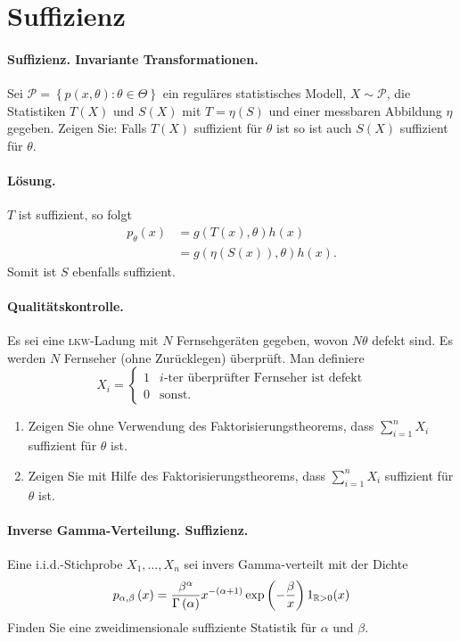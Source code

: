 \section{Suffizienz}


\paragraph{Suffizienz. Invariante Transformationen.} 
Sei $\mathcal P = \left\{ p(x,\theta) : \theta\in\Theta \right\}$ ein reguläres
statistisches Modell, $X\sim \mathcal P$, die Statistiken $T(X)$ und $S(X)$ mit
$T=\eta(S)$ und einer messbaren Abbildung $\eta$ gegeben. Zeigen Sie: Falls
$T(X)$ suffizient für $\theta$ ist so ist auch $S(X)$ suffizient für $\theta$.

\paragraph*{Lösung.} $T$ ist suffizient, so folgt
\begin{align*}
    p_\theta(x) &= g(T(x), \theta) h(x) \\
    &= g(\eta(S(x)), \theta) h(x). 
\end{align*}
Somit ist $S$ ebenfalls suffizient. 



\paragraph{Qualitätskontrolle.} 
Es sei eine \textsc{lkw}-Ladung mit $N$ Fernsehgeräten gegeben, wovon $N
\theta$ defekt sind. Es werden $N$ Fernseher (ohne Zurücklegen) überprüft.  Man
definiere
\begin{equation*}
    X_i = \begin{cases}
        1 & \text{$i$-ter überprüfter Fernseher ist defekt} \\
        0 & \text{sonst}.
    \end{cases}
\end{equation*}
\begin{enumerate}
    \item Zeigen Sie ohne Verwendung des Faktorisierungstheorems, dass $\sum_{i=1}^{n} X_i$ 
        suffizient für $\theta$ ist. 
    \item Zeigen Sie mit Hilfe des Faktorisierungstheorems, dass $\sum_{i=1}^{n} X_i$ suffizient
        für $\theta$ ist.
\end{enumerate}


\paragraph{Inverse Gamma-Verteilung. Suffizienz.}
Eine i.i.d.-Stichprobe $X_1, \ldots, X_n$ sei invers Gamma-verteilt mit der
Dichte 
\begin{equation*}
    p_{\alpha, \beta}\left( x \right) = 
    \frac{\beta^\alpha}{ \Gamma\left( \alpha \right)} x^{-(\alpha+1)}\exp\left( -\frac{\beta}{x} \right)1_{\mathbb R>0}(x)
\end{equation*}
Finden Sie eine zweidimensionale suffiziente Statistik für $\alpha$ und $\beta$.


